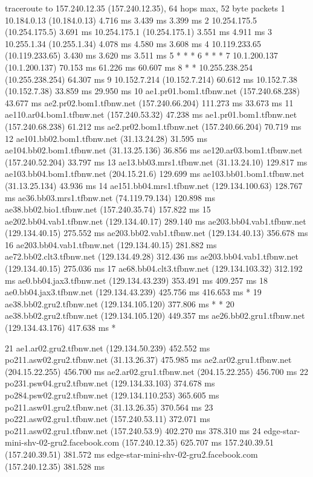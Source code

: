 \documentclass{article}
\begin{document}
\begin{code}
traceroute to 157.240.12.35 (157.240.12.35), 64 hops max, 52 byte packets
 1  10.184.0.13 (10.184.0.13)  4.716 ms  3.439 ms  3.399 ms
 2  10.254.175.5 (10.254.175.5)  3.691 ms
    10.254.175.1 (10.254.175.1)  3.551 ms  4.911 ms
 3  10.255.1.34 (10.255.1.34)  4.078 ms  4.580 ms  3.608 ms
 4  10.119.233.65 (10.119.233.65)  3.430 ms  3.620 ms  3.511 ms
 5  * * *
 6  * * *
 7  10.1.200.137 (10.1.200.137)  70.153 ms  61.226 ms  60.607 ms
 8  * * 10.255.238.254 (10.255.238.254)  64.307 ms
 9  10.152.7.214 (10.152.7.214)  60.612 ms
    10.152.7.38 (10.152.7.38)  33.859 ms  29.950 ms
10  ae1.pr01.bom1.tfbnw.net (157.240.68.238)  43.677 ms
    ae2.pr02.bom1.tfbnw.net (157.240.66.204)  111.273 ms  33.673 ms
11  ae110.ar04.bom1.tfbnw.net (157.240.53.32)  47.238 ms
    ae1.pr01.bom1.tfbnw.net (157.240.68.238)  61.212 ms
    ae2.pr02.bom1.tfbnw.net (157.240.66.204)  70.719 ms
12  ae101.bb02.bom1.tfbnw.net (31.13.24.28)  31.595 ms
    ae104.bb02.bom1.tfbnw.net (31.13.25.136)  36.856 ms
    ae120.ar03.bom1.tfbnw.net (157.240.52.204)  33.797 ms
13  ae13.bb03.mrs1.tfbnw.net (31.13.24.10)  129.817 ms
    ae103.bb04.bom1.tfbnw.net (204.15.21.6)  129.699 ms
    ae103.bb01.bom1.tfbnw.net (31.13.25.134)  43.936 ms
14  ae151.bb04.mrs1.tfbnw.net (129.134.100.63)  128.767 ms
    ae36.bb03.mrs1.tfbnw.net (74.119.79.134)  120.898 ms
    ae38.bb02.bio1.tfbnw.net (157.240.35.74)  157.822 ms
15  ae202.bb04.vab1.tfbnw.net (129.134.40.17)  289.140 ms
    ae203.bb04.vab1.tfbnw.net (129.134.40.15)  275.552 ms
    ae203.bb02.vab1.tfbnw.net (129.134.40.13)  356.678 ms
16  ae203.bb04.vab1.tfbnw.net (129.134.40.15)  281.882 ms
    ae72.bb02.clt3.tfbnw.net (129.134.49.28)  312.436 ms
    ae203.bb04.vab1.tfbnw.net (129.134.40.15)  275.036 ms
17  ae68.bb04.clt3.tfbnw.net (129.134.103.32)  312.192 ms
    ae0.bb04.jax3.tfbnw.net (129.134.43.239)  353.491 ms  409.257 ms
18  ae0.bb04.jax3.tfbnw.net (129.134.43.239)  425.756 ms  416.653 ms *
19  ae38.bb02.gru2.tfbnw.net (129.134.105.120)  377.806 ms * *
20  ae38.bb02.gru2.tfbnw.net (129.134.105.120)  449.357 ms
    ae26.bb02.gru1.tfbnw.net (129.134.43.176)  417.638 ms *
\end{code}
\begin{code}
21  ae1.ar02.gru2.tfbnw.net (129.134.50.239)  452.552 ms
    po211.asw02.gru2.tfbnw.net (31.13.26.37)  475.985 ms
    ae2.ar02.gru1.tfbnw.net (204.15.22.255)  456.700 ms
    ae2.ar02.gru1.tfbnw.net (204.15.22.255)  456.700 ms
22  po231.psw04.gru2.tfbnw.net (129.134.33.103)  374.678 ms
    po284.psw02.gru2.tfbnw.net (129.134.110.253)  365.605 ms
    po211.asw01.gru2.tfbnw.net (31.13.26.35)  370.564 ms
23  po221.asw02.gru1.tfbnw.net (157.240.53.11)  372.071 ms
    po211.asw02.gru1.tfbnw.net (157.240.53.9)  402.270 ms  378.310 ms
24  edge-star-mini-shv-02-gru2.facebook.com (157.240.12.35)  625.707 ms
    157.240.39.51 (157.240.39.51)  381.572 ms
    edge-star-mini-shv-02-gru2.facebook.com (157.240.12.35)  381.528 ms
\end{code}
\end{document}
